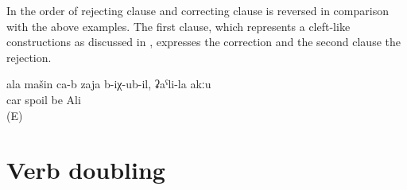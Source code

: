 In  the order of rejecting clause and correcting clause is reversed in comparison with the above examples. The first clause, which represents a cleft-like constructions as discussed in , expresses the correction and the second clause the rejection.

\begin{exe}
	\ex	\label{ex:It is your car that is spoiled, not Ali's}
	\gll	ala mašin ca-b	zaja	b-iχ-ub-il,	ʡaˁli-la	akːu\\
			car		spoil	be Ali	\\
	\glt	{} (E)
\end{exe}


\section{Verb doubling}
\label{sec:Verb doubling}

